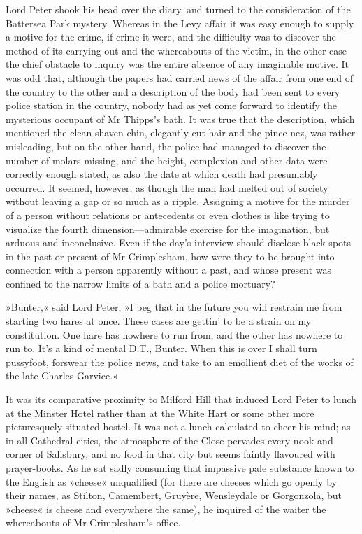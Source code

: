 Lord Peter shook his head over the diary, and turned to the consideration of the Battersea Park mystery. Whereas in the Levy affair it was easy enough to supply a motive for the crime, if crime it were, and the difficulty was to discover the method of its carrying out and the whereabouts of the victim, in the other case the chief obstacle to inquiry was the entire absence of any imaginable motive. It was odd that, although the papers had carried news of the affair from one end of the country to the other and a description of the body had been sent to every police station in the country, nobody had as yet come forward to identify the mysterious occupant of Mr Thipps's bath. It was true that the description, which mentioned the clean-shaven chin, elegantly cut hair and the pince-nez, was rather misleading, but on the other hand, the police had managed to discover the number of molars missing, and the height, complexion and other data were correctly enough stated, as also the date at which death had presumably occurred. It seemed, however, as though the man had melted out of society without leaving a gap or so much as a ripple. Assigning a motive for the murder of a person without relations or antecedents or even clothes is like trying to visualize the fourth dimension\allowbreak---\allowbreak admirable exercise for the imagination, but arduous and inconclusive. Even if the day's interview should disclose black spots in the past or present of Mr Crimplesham, how were they to be brought into connection with a person apparently without a past, and whose present was confined to the narrow limits of a bath and a police mortuary?

»Bunter,« said Lord Peter, »I beg that in the future you will restrain me from starting two hares at once. These cases are gettin' to be a strain on my constitution. One hare has nowhere to run from, and the other has nowhere to run to. It's a kind of mental D.T., Bunter. When this is over I shall turn pussyfoot, forswear the police news, and take to an emollient diet of the works of the late Charles Garvice.«

It was its comparative proximity to Milford Hill that induced Lord Peter to lunch at the Minster Hotel rather than at the White Hart or some other more picturesquely situated hostel. It was not a lunch calculated to cheer his mind; as in all Cathedral cities, the atmosphere of the Close pervades every nook and corner of Salisbury, and no food in that city but seems faintly flavoured with prayer-books. As he sat sadly consuming that impassive pale substance known to the English as »cheese« unqualified (for there are cheeses which go openly by their names, as Stilton, Camembert, Gruyère, Wensleydale or Gorgonzola, but »cheese« is cheese and everywhere the same), he inquired of the waiter the whereabouts of Mr Crimplesham's office.

